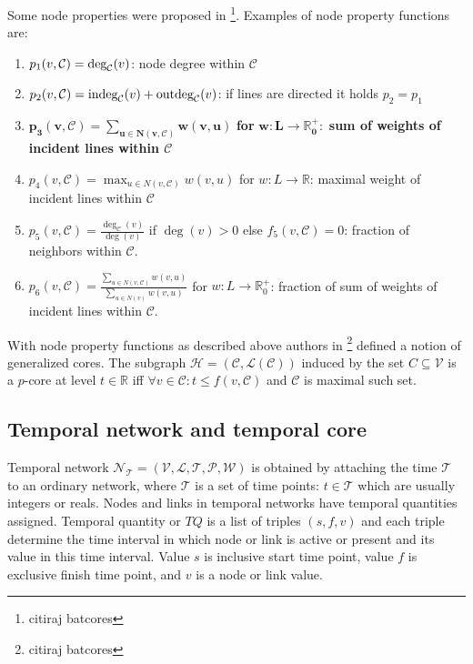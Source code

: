 \documentclass[a4paper,twoside,10pt]{article}
\newcommand{\Deg}{\mbox{\rm{deg}}}
\newcommand{\C}{\mathcal{C}}
\newcommand{\indeg}{\mbox{\rm{indeg}}}
\newcommand{\outdeg}{\mbox{\rm{outdeg}}}
\begin{document}
Some node properties were proposed in \footnote{citiraj batcores}. Examples of node property functions are:
\begin{enumerate}
\item $p_1 (v, \C) = \Deg_{\C}(v)$: node degree within $\C$
\item $p_2 (v, \C) = \indeg_{\C}(v) + \outdeg_{\C}(v)$: if lines are directed it holds $p_2 = p_1$
\item $\mathbf{p_3 (v, \C) = \sum_{u \in N(v, \C)} w(v,u)}$ \textbf{for} $\mathbf{w: L \rightarrow \mathbb{R}_0^+:}$ \textbf{sum of weights of incident lines within $\C$}
\item $p_4 (v, \C) = \max_{u \in N(v, \C)} w(v, u)$ for $w: L \rightarrow \mathbb{R}$: maximal weight of incident lines within $\C$
\item $p_5 (v, \C) = \frac{\deg_{\C}(v)}{\deg(v)}$ if $\deg(v) > 0$ else $f_5 (v, \C) = 0$: fraction of neighbors within $\C$.
\item $p_6 (v, \C) = \frac{\sum_{u \in N(v, \C)} w(v,u)}{\sum_{u \in N(v)} w(v,u)}$ for $w: L \rightarrow \mathbb{R}_0^+$: fraction of sum of weights of incident lines within $\C$.
\end{enumerate}


With node property functions as described above authors in \footnote{citiraj batcores} defined a notion of generalized cores. 
The subgraph $\mathcal{H} = (\C,\mathcal{L}(\C))$ induced by the set $C \subseteq \mathcal{V}$ is a $p$-core at level $t \in \mathbb{R}$ iff $\forall v \in \C : t \leq f(v, \C)$ and $\C$ is maximal such set.


\subsection{Temporal network and temporal core}\label{temporal}

Temporal network $\mathcal{N_T} = (\mathcal{V}, \mathcal{L}, \mathcal{T}, \mathcal{P}, \mathcal{W})$ is obtained by attaching the time $\mathcal{T}$ to an ordinary network, where $\mathcal{T}$ is a set of time points: $t \in \mathcal{T}$ which are usually integers or reals. Nodes and links in temporal networks have temporal quantities assigned. Temporal quantity or $TQ$ is a list of triples $(s, f, v)$ and each triple determine the time interval in which node or link is active or present and its value in this time interval. Value $s$ is inclusive start time point, value $f$ is exclusive finish time point, and $v$ is a node or link value.
\end{document}
